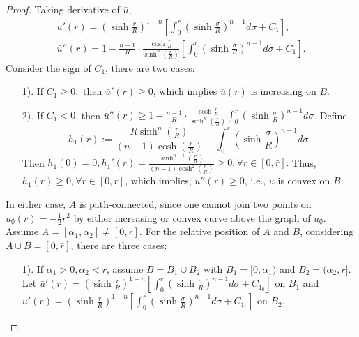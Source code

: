 \begin{proof}
	Taking derivative of $\bar{u}$, 
	\begin{align*}
	\bar{u}'(r) = (\sinh\frac{r}{R})^{1-n} [\int_{0}^{r} (\sinh\frac{\sigma }{R})^{n-1} d\sigma  +C_1],\\
	\bar{u}''(r) = 1-\frac{n-1}{R}\cdot \frac{\cosh \frac{r}{R}}{\sinh^n(\frac{r}{R})}[\int_{0}^{r} (\sinh\frac{\sigma }{R})^{n-1} d\sigma +C_1].
	\end{align*}
	Consider the sign of $C_1$, there are two cases:
	\begin{itemize}
		\item[1).]  If $C_1 \ge 0,$ then $\bar{u}'(r)\ge 0$, which implies $\bar{u}(r)$ is increasing on $B$.
		\item[2).] If $C_1<0$, then $\bar{u}''(r)\ge 1-\frac{n-1}{R}\cdot \frac{\cosh \frac{r}{R}}{\sinh^n(\frac{r}{R})}\int_{0}^{r} (\sinh\frac{\sigma }{R})^{n-1} d\sigma $. Define 
		$$h_1(r):= \frac{R\sinh^n(\frac{r}{R})}{(n-1)\cosh(\frac{r}{R})} - \int_{0}^{r} (\sinh\frac{\sigma }{R})^{n-1} d\sigma.$$ 
		Then $h_1(0)=0, h_1'(r) = \frac{\sinh^{n-1}(\frac{r}{R})}{(n-1)\cosh^2(\frac{r}{R})}\ge 0, \forall r\in [0, \bar{r}].$ Thus, $h_1(r) \ge 0 , \forall r\in [0, \bar{r}]$, which implies, $u''(r)\ge 0$, i.e., $\bar{u}$ is convex on $B$.
	\end{itemize}
	In either case, $A$ is path-connected, since one cannot join two points on $u_{\emptyset}(r) = -\frac{1}{2}r^2$ by either increasing or convex curve above the graph of $u_{\emptyset}$.\\
	Assume $A=[\alpha_1, \alpha_2] \neq [0, \bar{r}]$. For the relative position of $A$ and $B$, considering $A \cup B =[0,\bar{r}]$, there are three cases:
	\begin{itemize}
		\item [1).] If $\alpha_1>0, \alpha_2<\bar{r}$, assume $B = B_1 \cup B_2$ with $B_1 = [0, \alpha_1)$ and $B_2 = (\alpha_2, \bar{r}]$. Let $	\bar{u}'(r) = (\sinh\frac{r}{R})^{1-n} [\int_{0}^{r} (\sinh\frac{\sigma }{R})^{n-1} d\sigma  +C_{1_0}]$ on $B_1$ and 	$\bar{u}'(r) = (\sinh\frac{r}{R})^{1-n} [\int_{0}^{r} (\sinh\frac{\sigma }{R})^{n-1} d\sigma  + C_{1_{\bar{r}}}]$ on $B_2$.

\end{itemize}
\end{proof}
